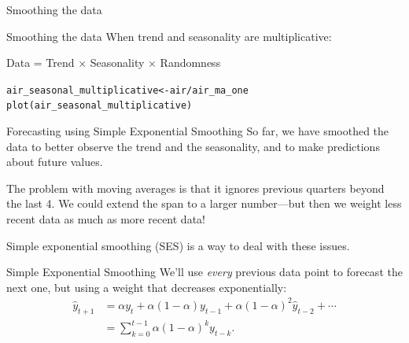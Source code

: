 \documentclass{beamer}\usepackage[]{graphicx}\usepackage[]{color}
\makeatletter
\newcommand{\hlopt}[1]{\textcolor[rgb]{1,0.894,0.769}{#1}}%
\newcommand{\hlstd}[1]{\textcolor[rgb]{1,0.894,0.769}{#1}}%
\newcommand{\hlkwb}[1]{\textcolor[rgb]{0.804,0.776,0.451}{#1}}%
\newcommand{\hlkwd}[1]{\textcolor[rgb]{1,0.78,0.769}{#1}}%
\newenvironment{kframe}{%
 \def\at@end@of@kframe{}%
 \ifinner\ifhmode%
  \def\at@end@of@kframe{\end{minipage}}%
  \begin{minipage}{\columnwidth}%
 \fi\fi%
 \def\FrameCommand##1{\hskip\@totalleftmargin \hskip-\fboxsep
 \colorbox{shadecolor}{##1}\hskip-\fboxsep
     \hskip-\linewidth \hskip-\@totalleftmargin \hskip\columnwidth}%
 \MakeFramed {\advance\hsize-\width
   \@totalleftmargin\z@ \linewidth\hsize
   \@setminipage}}%
 {\par\unskip\endMakeFramed%
 \at@end@of@kframe}
\newenvironment{knitrout}{}{} %
\makeatother
\begin{document}
\begin{darkframes}
\begin{frame}[fragile]{Smoothing the data}
\begin{knitrout}
\end{knitrout}
  
    \end{frame}
    
    
    \begin{frame}[fragile]{Smoothing the data}
      \fontsize{9}{9}\selectfont
        When trend and seasonality are multiplicative:
      \begin{center}
        Data = Trend $\times$ Seasonality $\times$ Randomness
      \end{center}
     
\begin{knitrout}
\begin{kframe}
\begin{alltt}
\hlstd{air_seasonal_multiplicative} \hlkwb{<-} \hlstd{air} \hlopt{/} \hlstd{air_ma_one}
\hlkwd{plot}\hlstd{(air_seasonal_multiplicative)}
\end{alltt}
\end{kframe}


\end{knitrout}
    \lc
    \end{frame}
    
    
    \begin{frame}[fragile]{Forecasting using Simple Exponential Smoothing}
        So far, we have smoothed the data to better observe the trend and the seasonality, and to make predictions about future values.
        \bigskip
        
        The problem with moving averages is that it ignores previous quarters beyond the last 4. We could extend the span to a larger number---but then we weight less recent data as much as more recent data!
        \bigskip

        Simple exponential smoothing (SES) is a way to deal with these issues.
    \end{frame}
    
    
    
    \begin{frame}[fragile]{Simple Exponential Smoothing}
      We'll use \emph{every} previous data point to forecast the next one, but using a weight that decreases exponentially:
      \begin{align*}
        \hat{y}_{t+1} &= \alpha y_t + \alpha (1-\alpha)y_{t-1} + \alpha (1-\alpha)^2 \hat{y}_{t-2} + \cdots \\
        &= \sum_{k=0}^{t-1} \alpha (1-\alpha)^k y_{t-k}.
      \end{align*}


\end{frame}
\end{darkframes}
\end{document}
